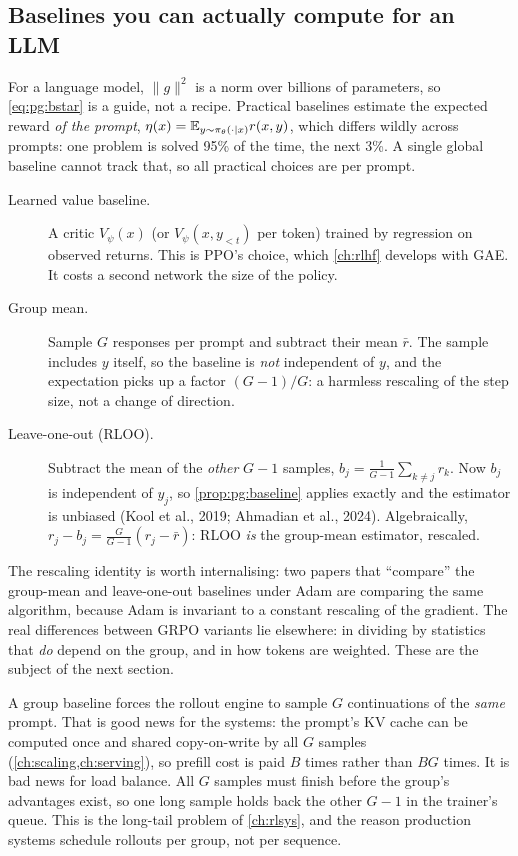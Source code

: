 \subsection{Baselines you can actually compute for an LLM}\label{sec:pg:practical}

For a language model, $\|g\|^2$ is a norm over billions of parameters, so \cref{eq:pg:bstar}
is a guide, not a recipe. Practical baselines estimate the expected reward \emph{of the
prompt}, $\eta(x)=\mathbb{E}_{y\sim\pi_\theta(\cdot\mid x)}r(x,y)$, which differs wildly across prompts:
one problem is solved 95\% of the time, the next 3\%. A single global baseline cannot track
that, so all practical choices are per prompt.

\begin{description}
\item[Learned value baseline.] A critic $V_\psi(x)$ (or $V_\psi(x,y_{<t})$ per token) trained
  by regression on observed returns. This is PPO's choice, which \cref{ch:rlhf} develops with
  GAE. It costs a second network the size of the policy.
\item[Group mean.] Sample $G$ responses per prompt and subtract their mean $\bar r$. The
  sample includes $y$ itself, so the baseline is \emph{not} independent of $y$, and the
  expectation picks up a factor $(G-1)/G$: a harmless rescaling of the step size, not a
  change of direction.
\item[Leave-one-out (RLOO).] Subtract the mean of the \emph{other} $G-1$ samples,
  $b_j=\frac{1}{G-1}\sum_{k\ne j}r_k$. Now $b_j$ is independent of $y_j$, so
  \cref{prop:pg:baseline} applies exactly and the estimator is unbiased (Kool et al., 2019;
  Ahmadian et al., 2024). Algebraically, $r_j-b_j=\frac{G}{G-1}(r_j-\bar r)$: RLOO \emph{is}
  the group-mean estimator, rescaled.
\end{description}
The rescaling identity is worth internalising: two papers that ``compare'' the group-mean
and leave-one-out baselines under Adam are comparing the same algorithm, because Adam is
invariant to a constant rescaling of the gradient. The real differences between GRPO
variants lie elsewhere: in dividing by statistics that \emph{do} depend on the group, and in
how tokens are weighted. These are the subject of the next section.

\begin{systemslens}
A group baseline forces the rollout engine to sample $G$ continuations of the \emph{same}
prompt. That is good news for the systems: the prompt's KV cache can be computed once and
shared copy-on-write by all $G$ samples (\cref{ch:scaling,ch:serving}), so prefill cost is
paid $B$ times rather than $BG$ times. It is bad news for load balance. All $G$ samples must
finish before the group's advantages exist, so one long sample holds back the other
$G-1$ in the trainer's queue. This is the long-tail problem of \cref{ch:rlsys}, and the reason
production systems schedule rollouts per group, not per sequence.
\end{systemslens}

